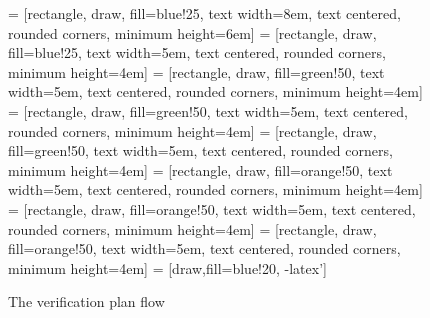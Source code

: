 \documentclass[conference,10 pt,twoside]{IEEEtran}
\begin{document}
\begin{center}
\begin{figure}[h]
\centering
{} = [rectangle, draw, fill=blue!25, text width=8em, text centered, rounded corners, minimum height=6em]
 = [rectangle, draw, fill=blue!25, text width=5em, text centered, rounded corners, minimum height=4em]
 = [rectangle, draw, fill=green!50, text width=5em, text centered, rounded corners, minimum height=4em]
 = [rectangle, draw, fill=green!50, text width=5em, text centered, rounded corners, minimum height=4em]
 = [rectangle, draw, fill=green!50, text width=5em, text centered, rounded corners, minimum height=4em]
 = [rectangle, draw, fill=orange!50, text width=5em, text centered, rounded corners, minimum height=4em]
 = [rectangle, draw, fill=orange!50, text width=5em, text centered, rounded corners, minimum height=4em]
 = [rectangle, draw, fill=orange!50, text width=5em, text centered, rounded corners, minimum height=4em]
 = [draw,fill=blue!20, -latex']

\label{Figure1:tikzpicture} 
\caption{The verification plan flow} 
\end{figure}
\end{center}
\end{document}
